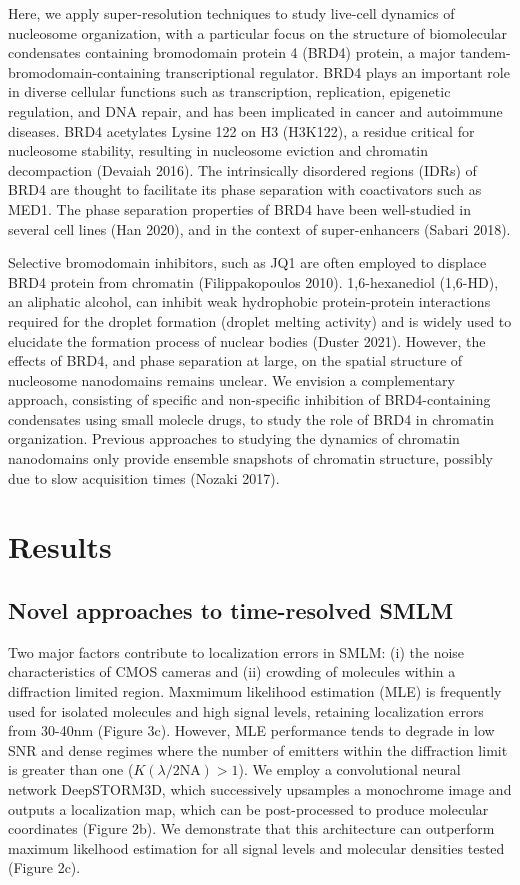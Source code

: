 \documentclass{ucetd}
\begin{document}
Here, we apply super-resolution techniques to study live-cell dynamics of nucleosome organization, with a particular focus on the structure of biomolecular condensates containing bromodomain protein 4 (BRD4) protein, a major tandem-bromodomain-containing transcriptional regulator. BRD4 plays an important role in diverse cellular functions such as transcription, replication, epigenetic regulation, and DNA repair, and has been implicated in cancer and autoimmune diseases. BRD4 acetylates Lysine 122 on H3 (H3K122), a residue critical for nucleosome stability, resulting in nucleosome eviction and chromatin decompaction (Devaiah 2016). The intrinsically disordered regions (IDRs) of BRD4 are thought to facilitate its phase separation with coactivators such as MED1. The phase separation properties of BRD4 have been well-studied in several cell lines (Han 2020), and in the context of super-enhancers (Sabari 2018).

Selective bromodomain inhibitors, such as JQ1 are often employed to displace BRD4 protein from chromatin (Filippakopoulos 2010). 1,6-hexanediol (1,6-HD), an aliphatic alcohol, can inhibit weak hydrophobic protein-protein interactions required for the droplet formation (droplet melting activity) and is widely used to elucidate the formation process of nuclear bodies (Duster 2021). However, the effects of BRD4, and phase separation at large, on the spatial structure of nucleosome nanodomains remains unclear. We envision a complementary approach, consisting of specific and non-specific inhibition of BRD4-containing condensates using small molecle drugs, to study the role of BRD4 in chromatin organization. Previous approaches to studying the dynamics of chromatin nanodomains only provide ensemble snapshots of chromatin structure, possibly due to slow acquisition times (Nozaki 2017). 


\section{Results}

\subsection{Novel approaches to time-resolved SMLM}

Two major factors contribute to localization errors in SMLM: (i) the noise characteristics of CMOS cameras and (ii) crowding of molecules within a diffraction limited region. Maxmimum likelihood estimation (MLE) is frequently used for isolated molecules and high signal levels, retaining localization errors from 30-40nm (Figure 3c). However, MLE performance tends to degrade in low SNR and dense regimes where the number of emitters within the diffraction limit is greater than one ($K(\lambda/2\mathrm{NA}) > 1$). We employ a convolutional neural network DeepSTORM3D, which successively upsamples a monochrome image and outputs a localization map, which can be post-processed to produce molecular coordinates (Figure 2b).  We demonstrate that this architecture can outperform maximum likelhood estimation for all signal levels and molecular densities tested (Figure 2c).
\end{document}
